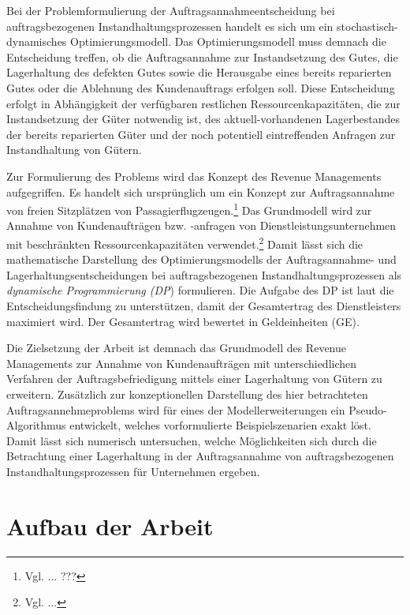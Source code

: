 Bei der Problemformulierung der Auftragsannahmeentscheidung bei auftragsbezogenen Instandhaltungsprozessen handelt es sich um ein stochastisch-dynamisches Optimierungsmodell. Das Optimierungsmodell muss demnach die Entscheidung treffen, ob die Auftragsannahme zur Instandsetzung des Gutes, die Lagerhaltung des defekten Gutes sowie die Herausgabe eines bereits reparierten Gutes oder die Ablehnung des Kundenauftrags erfolgen soll. Diese Entscheidung erfolgt in Abhängigkeit der verfügbaren restlichen Ressourcenkapazitäten, die zur Instandsetzung der Güter notwendig ist, des aktuell-vorhandenen Lagerbestandes der bereits reparierten Güter und der noch potentiell eintreffenden Anfragen zur Instandhaltung von Gütern.

Zur Formulierung des Problems wird das Konzept des Revenue Managements aufgegriffen. Es handelt sich ursprünglich um ein Konzept zur Auftragsannahme von freien Sitzplätzen von Passagierflugzeugen.\footnote{Vgl. ... ???} Das Grundmodell wird zur Annahme von Kundenaufträgen bzw. -anfragen von Dienstleistungsunternehmen mit beschränkten Ressourcenkapazitäten verwendet.\footnote{Vgl. ...} %
Damit lässt sich die mathematische Darstellung des Optimierungsmodells der Auftragsannahme- und Lagerhaltungsentscheidungen bei auftragsbezogenen Instandhaltungsprozessen als \textit{dynamische Programmierung (DP}) formulieren.
Die Aufgabe des DP ist laut \cite{talluri2004theory} die Entscheidungsfindung zu unterstützen, damit der Gesamtertrag des Dienstleisters maximiert wird. Der Gesamtertrag wird bewertet in Geldeinheiten (GE). 


Die Zielsetzung der Arbeit ist demnach das Grundmodell des Revenue Managements zur Annahme von Kundenaufträgen mit unterschiedlichen Verfahren der Auftragsbefriedigung mittels einer Lagerhaltung von Gütern zu erweitern. Zusätzlich zur konzeptionellen Darstellung des hier betrachteten Auftragsannehmeproblems wird für eines der Modellerweiterungen ein Pseudo-Algorithmus entwickelt, welches vorformulierte Beispielszenarien exakt löst.  Damit lässt sich numerisch untersuchen, welche Möglichkeiten sich durch die Betrachtung einer Lagerhaltung in der Auftragsannahme von auftragsbezogenen Instandhaltungsprozessen für Unternehmen ergeben.

\section{Aufbau der Arbeit}

